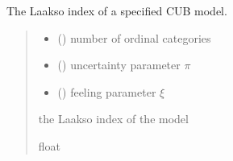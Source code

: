 \documentclass[letterpaper,10pt,english]{sphinxmanual}
\begin{document}
\begin{fulllineitems}
\label{\detokenize{cubmods:cubmods.cub.laakso}}
\pysigstartsignatures
{}
\pysigstopsignatures
\sphinxAtStartPar
The Laakso index of a specified CUB model.
\begin{quote}\begin{description}
\begin{itemize}
\item {} 
\sphinxAtStartPar
{} () \textendash{} number of ordinal categories

\item {} 
\sphinxAtStartPar
{} () \textendash{} uncertainty parameter \(\pi\)

\item {} 
\sphinxAtStartPar
{} () \textendash{} feeling parameter \(\xi\)

\end{itemize}

\sphinxAtStartPar
the Laakso index of the model

\sphinxAtStartPar
float

\end{description}\end{quote}

\end{fulllineitems}

\end{document}
